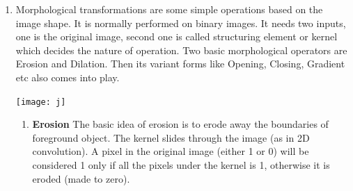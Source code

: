 \documentclass[12pt,a4paper]{article}
\begin{document}
\begin{enumerate}
  \item Morphological transformations are some simple operations based on the image shape. It is normally performed on binary images. It needs two inputs, one is the original image, second one is called structuring element or kernel which decides the nature of operation. Two basic morphological operators are Erosion and Dilation. Then its variant forms like Opening, Closing, Gradient etc also comes into play.
    \begin{center}
        \texttt{[image: j]}
    \end{center}
    \begin{enumerate}
    \item \textbf{Erosion}
    The basic idea of erosion is to erode away the boundaries of foreground object. The kernel slides through the image (as in 2D convolution). A pixel in the original image (either 1 or 0) will be considered 1 only if all the pixels under the kernel is 1, otherwise it is eroded (made to zero).


\end{enumerate}
\end{enumerate}
\end{document}
